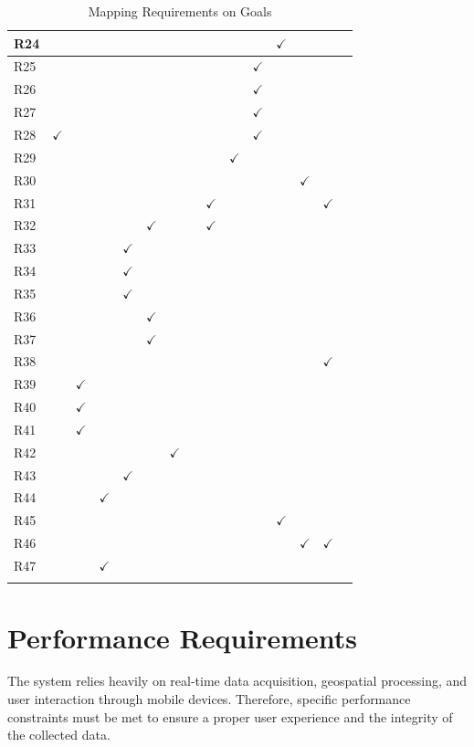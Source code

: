 \begin{longtable}{|l|c|c|c|c|c|c|c|c|c|c|c|c|c|c|}
R24 & & & & & & & & & & & $\checkmark$ & & & \\ \hline
R25 & & & & & & & & & & $\checkmark$ & & & & \\ \hline
R26 & & & & & & & & & & $\checkmark$ & & & & \\ \hline
R27 & & & & & & & & & & $\checkmark$ & & & & \\ \hline
R28 & $\checkmark$ & & & & & & & & & $\checkmark$ & & & & \\ \hline
R29 & & & & & & & & & $\checkmark$ & & & & & \\ \hline
R30 & & & & & & & & & & & & $\checkmark$ & & \\ \hline
R31 & & & & & & & & $\checkmark$ & & & & & $\checkmark$ & \\ \hline
R32 & & & & & $\checkmark$ & & & $\checkmark$ & & & & & & \\ \hline
R33 & & & & $\checkmark$ & & & & & & & & & & \\ \hline
R34 & & & & $\checkmark$ & & & & & & & & & & \\ \hline
R35 & & & & $\checkmark$ & & & & & & & & & & \\ \hline
R36 & & & & & $\checkmark$ & & & & & & & & & \\ \hline
R37 & & & & & $\checkmark$ & & & & & & & & & \\ \hline
R38 & & & & & & & & & & & & & $\checkmark$ & \\ \hline
R39 & & $\checkmark$ & & & & & & & & & & & & \\ \hline
R40 & & $\checkmark$ & & & & & & & & & & & & \\ \hline
R41 & & $\checkmark$ & & & & & & & & & & & & \\ \hline
R42& & & & & & $\checkmark$ & & & & & & & & \\ \hline
R43 & & & & $\checkmark$ & & & & & & & & & & \\ \hline
R44 & & & $\checkmark$ & & & & & & & & & & & \\ \hline
R45 & & & & & & & & & & & $\checkmark$ & & & \\ \hline
R46 & & & & & & & & & & & & $\checkmark$ & $\checkmark$ & \\ \hline
R47 & & & $\checkmark$ & & & & & & & & & & & \\ \hline
\caption{Mapping Requirements on Goals}
\end{longtable}

\section{Performance Requirements}
The system relies heavily on real-time data acquisition, geospatial processing, and user interaction through 
mobile devices. Therefore, specific performance constraints must be met to ensure a proper user experience and the 
integrity of the collected data.

